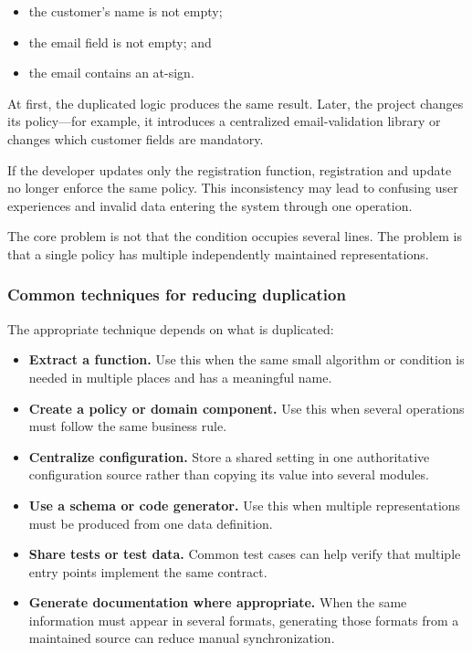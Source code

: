\documentclass[12pt,a4paper]{article}
\begin{document}
\begin{itemize}

\item the customer's name is not empty;

\item the email field is not empty; and

\item the email contains an at-sign.

\end{itemize}

At first, the duplicated logic produces the same result. Later, the project changes its policy—for example, it introduces a centralized email-validation library or changes which customer fields are mandatory.

If the developer updates only the registration function, registration and update no longer enforce the same policy. This inconsistency may lead to confusing user experiences and invalid data entering the system through one operation.

The core problem is not that the condition occupies several lines. The problem is that a single policy has multiple independently maintained representations.

\subsubsection{Common techniques for reducing duplication}

The appropriate technique depends on what is duplicated:

\begin{itemize}

\item \textbf{Extract a function.} Use this when the same small algorithm or condition is needed in multiple places and has a meaningful name.

\item \textbf{Create a policy or domain component.} Use this when several operations must follow the same business rule.

\item \textbf{Centralize configuration.} Store a shared setting in one authoritative configuration source rather than copying its value into several modules.

\item \textbf{Use a schema or code generator.} Use this when multiple representations must be produced from one data definition.

\item \textbf{Share tests or test data.} Common test cases can help verify that multiple entry points implement the same contract.

\item \textbf{Generate documentation where appropriate.} When the same information must appear in several formats, generating those formats from a maintained source can reduce manual synchronization.

\end{itemize}
\end{document}
